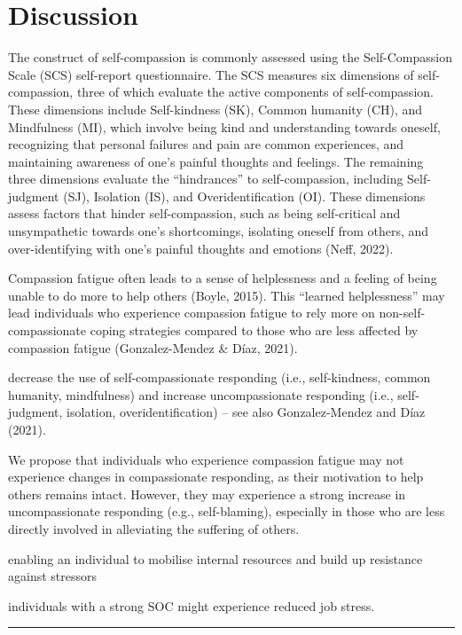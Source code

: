\documentclass[
  man]{apa7}
\begin{document}
\hypertarget{discussion}{%
\section{Discussion}\label{discussion}}

The construct of self-compassion is commonly assessed using the Self-Compassion Scale (SCS) self-report questionnaire. The SCS measures six dimensions of self-compassion, three of which evaluate the active components of self-compassion. These dimensions include Self-kindness (SK), Common humanity (CH), and Mindfulness (MI), which involve being kind and understanding towards oneself, recognizing that personal failures and pain are common experiences, and maintaining awareness of one's painful thoughts and feelings. The remaining three dimensions evaluate the ``hindrances'' to self-compassion, including Self-judgment (SJ), Isolation (IS), and Overidentification (OI). These dimensions assess factors that hinder self-compassion, such as being self-critical and unsympathetic towards one's shortcomings, isolating oneself from others, and over-identifying with one's painful thoughts and emotions (Neff, 2022).

Compassion fatigue often leads to a sense of helplessness and a feeling of being unable to do more to help others (Boyle, 2015). This ``learned helplessness'' may lead individuals who experience compassion fatigue to rely more on non-self-compassionate coping strategies compared to those who are less affected by compassion fatigue (Gonzalez-Mendez \& Díaz, 2021).

decrease the use of self-compassionate responding (i.e., self-kindness, common humanity, mindfulness) and increase uncompassionate responding (i.e., self-judgment, isolation, overidentification) -- see also Gonzalez-Mendez and Díaz (2021).

We propose that individuals who experience compassion fatigue may not experience changes in compassionate responding, as their motivation to help others remains intact. However, they may experience a strong increase in uncompassionate responding (e.g., self-blaming), especially in those who are less directly involved in alleviating the suffering of others.

enabling an individual to mobilise internal resources and build up resistance against stressors

individuals with a strong SOC might experience reduced job stress.

\begin{center}\rule{0.5\linewidth}{0.5pt}\end{center}
\end{document}
